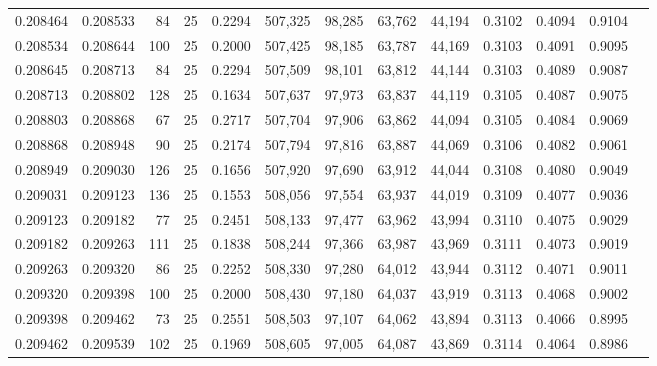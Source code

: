 \begin{tabular}{rrrrrrrrrrrrr}
0.208464 & 0.208533 &    84 &  25 &                                     0.2294 & 507,325 &  98,285 &  63,762 &  44,194 & 0.3102 & 0.4094 & 0.9104 \\
0.208534 & 0.208644 &   100 &  25 &                                     0.2000 & 507,425 &  98,185 &  63,787 &  44,169 & 0.3103 & 0.4091 & 0.9095 \\
0.208645 & 0.208713 &    84 &  25 &                                     0.2294 & 507,509 &  98,101 &  63,812 &  44,144 & 0.3103 & 0.4089 & 0.9087 \\
0.208713 & 0.208802 &   128 &  25 &                                     0.1634 & 507,637 &  97,973 &  63,837 &  44,119 & 0.3105 & 0.4087 & 0.9075 \\
0.208803 & 0.208868 &    67 &  25 &                                     0.2717 & 507,704 &  97,906 &  63,862 &  44,094 & 0.3105 & 0.4084 & 0.9069 \\
0.208868 & 0.208948 &    90 &  25 &                                     0.2174 & 507,794 &  97,816 &  63,887 &  44,069 & 0.3106 & 0.4082 & 0.9061 \\
0.208949 & 0.209030 &   126 &  25 &                                     0.1656 & 507,920 &  97,690 &  63,912 &  44,044 & 0.3108 & 0.4080 & 0.9049 \\
0.209031 & 0.209123 &   136 &  25 &                                     0.1553 & 508,056 &  97,554 &  63,937 &  44,019 & 0.3109 & 0.4077 & 0.9036 \\
0.209123 & 0.209182 &    77 &  25 &                                     0.2451 & 508,133 &  97,477 &  63,962 &  43,994 & 0.3110 & 0.4075 & 0.9029 \\
0.209182 & 0.209263 &   111 &  25 &                                     0.1838 & 508,244 &  97,366 &  63,987 &  43,969 & 0.3111 & 0.4073 & 0.9019 \\
0.209263 & 0.209320 &    86 &  25 &                                     0.2252 & 508,330 &  97,280 &  64,012 &  43,944 & 0.3112 & 0.4071 & 0.9011 \\
0.209320 & 0.209398 &   100 &  25 &                                     0.2000 & 508,430 &  97,180 &  64,037 &  43,919 & 0.3113 & 0.4068 & 0.9002 \\
0.209398 & 0.209462 &    73 &  25 &                                     0.2551 & 508,503 &  97,107 &  64,062 &  43,894 & 0.3113 & 0.4066 & 0.8995 \\
0.209462 & 0.209539 &   102 &  25 &                                     0.1969 & 508,605 &  97,005 &  64,087 &  43,869 & 0.3114 & 0.4064 & 0.8986 \\

\end{tabular}
